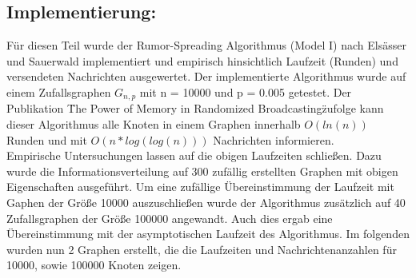 \documentclass[12pt,a4paper]{report}
\begin{document}
\subsection*{Implementierung:}
Für diesen Teil wurde der Rumor-Spreading Algorithmus (Model I) nach Elsässer und Sauerwald implementiert und empirisch hinsichtlich Laufzeit (Runden) und versendeten Nachrichten ausgewertet. Der implementierte Algorithmus wurde auf einem 
Zufallsgraphen $G_{n,p}$ mit n = 10000 und p = 0.005 getestet.
Der Publikation \"The Power of Memory in Randomized Broadcasting\" zufolge kann dieser Algorithmus alle Knoten in einem
Graphen innerhalb $O(ln(n))$ Runden und mit $O(n * log(log(n)))$ Nachrichten informieren.\\
Empirische Untersuchungen lassen auf die obigen Laufzeiten schließen.
Dazu wurde die Informationsverteilung auf 300 zufällig erstellten Graphen mit obigen Eigenschaften  ausgeführt.
Um eine zufällige Übereinstimmung der Laufzeit mit Gaphen der Größe 10000 auszuschließen wurde der Algorithmus
zusätzlich auf 40 Zufallsgraphen der Größe 100000 angewandt. Auch dies ergab eine Übereinstimmung mit der asymptotischen
Laufzeit des Algorithmus. Im folgenden wurden nun 2 Graphen erstellt, die die Laufzeiten und Nachrichtenanzahlen für 10000, sowie 100000 Knoten zeigen.
\end{document}
